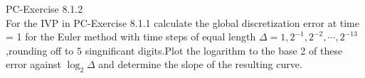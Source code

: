 \documentclass[dvipdfmx,cjk]{beamer}
\numberwithin{equation}{section}
\begin{document}
\begin{frame}    
\begin{center}
    \end{center}

\end{frame}
\begin{frame}    
PC-Exercise 8.1.2\\
For the IVP in PC-Exercise 8.1.1 calculate the global discretization
error at time = 1 for the Euler method with time steps of equal length
\(\Delta = 1,2^{-1},2^{-2},\cdots,2^{-13}\),rounding off to \(5\)
singnificant digits.Plot the logarithm to the base 2 of these error
against \(\log_2 \Delta\) and determine the slope of the resulting
curve.
\end{frame}
\end{document}
